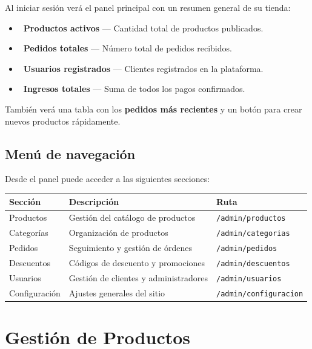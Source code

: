 \documentclass[12pt,a4paper]{article}
\begin{document}
Al iniciar sesión verá el panel principal con un resumen general de su tienda:

\begin{itemize}[leftmargin=2cm]
    \item \faBox\ \textbf{Productos activos} --- Cantidad total de productos publicados.
    \item \faShoppingCart\ \textbf{Pedidos totales} --- Número total de pedidos recibidos.
    \item \faUsers\ \textbf{Usuarios registrados} --- Clientes registrados en la plataforma.
    \item \faDollarSign\ \textbf{Ingresos totales} --- Suma de todos los pagos confirmados.
\end{itemize}

También verá una tabla con los \textbf{pedidos más recientes} y un botón para crear nuevos productos rápidamente.

\subsection{Menú de navegación}

Desde el panel puede acceder a las siguientes secciones:

\begin{table}[h]
\centering
\begin{tabularx}{\textwidth}{lXl}
    \toprule
    \textbf{Sección} & \textbf{Descripción} & \textbf{Ruta} \\
    \midrule
    Productos    & Gestión del catálogo de productos   & \texttt{/admin/productos} \\
    Categorías   & Organización de productos            & \texttt{/admin/categorias} \\
    Pedidos      & Seguimiento y gestión de órdenes     & \texttt{/admin/pedidos} \\
    Descuentos   & Códigos de descuento y promociones   & \texttt{/admin/descuentos} \\
    Usuarios     & Gestión de clientes y administradores & \texttt{/admin/usuarios} \\
    Configuración & Ajustes generales del sitio          & \texttt{/admin/configuracion} \\
    \bottomrule
\end{tabularx}
\end{table}

\section{Gestión de Productos}
\end{document}
